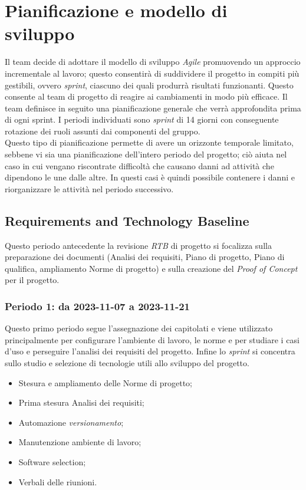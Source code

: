 \documentclass[10pt, a4paper]{article}
\begin{document}
\section{Pianificazione e modello di sviluppo}
\label{section:Pianificazione}

Il team decide di adottare il modello di sviluppo \textit{Agile\pg} 
promuovendo un approccio incrementale al lavoro; questo consentirà di suddividere il progetto in compiti più gestibili, ovvero \textit{sprint}, ciascuno dei quali produrrà risultati funzionanti. Questo consente al team di progetto di reagire ai cambiamenti in modo più efficace.
Il team definisce in seguito una pianificazione generale che verrà approfondita prima di ogni sprint.
I periodi individuati sono \textit{sprint} di 14 giorni con conseguente rotazione dei ruoli assunti dai componenti del gruppo.\\
Questo tipo di pianificazione permette di avere un orizzonte temporale limitato, sebbene vi sia una pianificazione dell'intero periodo del progetto; ciò aiuta nel caso in cui vengano riscontrate difficoltà che causano danni ad attività che dipendono le une dalle altre. In questi casi è quindi possibile contenere i danni e riorganizzare le attività nel periodo successivo.

\subsection{Requirements and Technology Baseline}
Questo periodo antecedente la revisione \textit{RTB\pg} di progetto si focalizza sulla preparazione dei documenti (Analisi dei requisiti, Piano di progetto, Piano di qualifica, ampliamento Norme di progetto) e sulla creazione del \textit{Proof of Concept\pg} per il progetto.
\newpage
\subsubsection{Periodo 1: da 2023-11-07 a 2023-11-21}
Questo primo periodo segue l'assegnazione dei capitolati e viene utilizzato principalmente per configurare l'ambiente di lavoro, le norme e per studiare i casi d'uso e perseguire l'analisi dei requisiti del progetto. Infine lo \textit{sprint} si concentra sullo studio e selezione di tecnologie utili allo sviluppo del progetto.
\begin{itemize}
    \item Stesura e ampliamento delle Norme di progetto;
    \item Prima stesura Analisi dei requisiti;
    \item Automazione \textit{versionamento\pg};
    \item Manutenzione ambiente di lavoro;
    \item Software selection;
    \item Verbali delle riunioni.
        
\end{itemize}
\vspace{1em}
\end{document}
